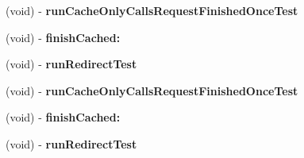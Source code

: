 \begin{DoxyCompactItemize}
\item 
\hypertarget{interface_a_s_i_download_cache_tests_07_08_aad474ecba9439c09df908bc01d41df5b}{
(void) -\/ {\bfseries run\-Cache\-Only\-Calls\-Request\-Finished\-Once\-Test}}
\label{interface_a_s_i_download_cache_tests_07_08_aad474ecba9439c09df908bc01d41df5b}

\item 
\hypertarget{interface_a_s_i_download_cache_tests_07_08_a5d06a9be86a6e2fd994899a53c5306c0}{
(void) -\/ {\bfseries finish\-Cached\-:}}
\label{interface_a_s_i_download_cache_tests_07_08_a5d06a9be86a6e2fd994899a53c5306c0}

\item 
\hypertarget{interface_a_s_i_download_cache_tests_07_08_a7f2465bd232577824ffe2b37a06d2fe0}{
(void) -\/ {\bfseries run\-Redirect\-Test}}
\label{interface_a_s_i_download_cache_tests_07_08_a7f2465bd232577824ffe2b37a06d2fe0}

\item 
\hypertarget{interface_a_s_i_download_cache_tests_07_08_aad474ecba9439c09df908bc01d41df5b}{
(void) -\/ {\bfseries run\-Cache\-Only\-Calls\-Request\-Finished\-Once\-Test}}
\label{interface_a_s_i_download_cache_tests_07_08_aad474ecba9439c09df908bc01d41df5b}

\item 
\hypertarget{interface_a_s_i_download_cache_tests_07_08_a5d06a9be86a6e2fd994899a53c5306c0}{
(void) -\/ {\bfseries finish\-Cached\-:}}
\label{interface_a_s_i_download_cache_tests_07_08_a5d06a9be86a6e2fd994899a53c5306c0}

\item 
\hypertarget{interface_a_s_i_download_cache_tests_07_08_a7f2465bd232577824ffe2b37a06d2fe0}{
(void) -\/ {\bfseries run\-Redirect\-Test}}
\label{interface_a_s_i_download_cache_tests_07_08_a7f2465bd232577824ffe2b37a06d2fe0}

\end{DoxyCompactItemize}


